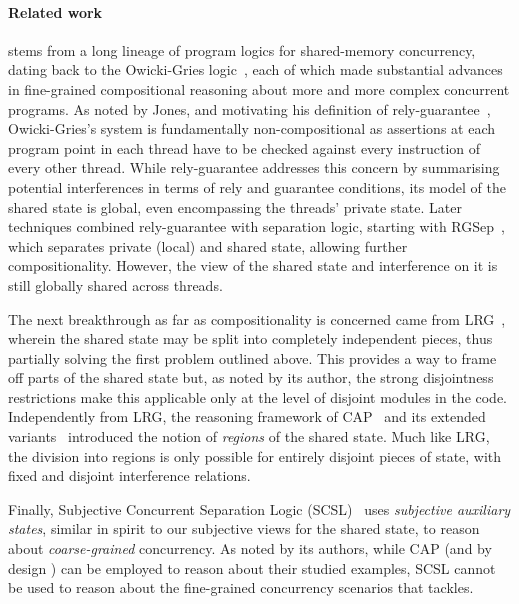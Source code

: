 \paragraph{Related work}
\colosl stems from a long lineage of program logics for shared-memory
concurrency, dating back to the Owicki-Gries logic~\cite{owicki}, each of
which made substantial advances in fine-grained compositional
reasoning about more and more complex concurrent programs. As noted by
Jones, and motivating his definition of rely-guarantee~\cite{rg},
Owicki-Gries's system is fundamentally non-compositional as assertions
at each program point in each thread have to be checked against every
instruction of every other thread. While rely-guarantee addresses
this concern by summarising potential interferences in terms of rely
and guarantee conditions, its model of the shared state is global,
even encompassing the threads' private state. Later techniques
combined rely-guarantee with separation logic, starting with
RGSep~\cite{viktor-marriage}, which separates private (local) and
shared state, allowing further compositionality. However, the view of
the shared state and interference on it is still globally shared
across threads. 

The next breakthrough as far as compositionality is
concerned came from LRG~\cite{lrg}, wherein the shared state may be
split into completely independent pieces, thus partially solving the
first problem outlined above. This provides a way to frame off parts
of the shared state but, as noted by its author, the strong
disjointness restrictions make this applicable only at the level of
disjoint modules in the code. Independently from LRG, the reasoning
framework of CAP~\cite{cap-ecoop10}
and its extended variants~\cite{icap,tada} introduced the notion
of \emph{regions} of the shared state. Much like LRG, the division into
regions is only possible for entirely disjoint pieces of state, with
fixed and disjoint interference relations.

Finally, Subjective Concurrent Separation Logic (SCSL)~\cite{SCSL}
uses \emph{subjective auxiliary states}, similar in spirit to our
subjective views for the shared state, to reason about \emph{coarse-grained}
concurrency. As noted by its authors, while CAP (and by design \colosl) can
be employed to reason about their studied examples, SCSL cannot be
used to reason about the fine-grained concurrency scenarios that \colosl tackles.
